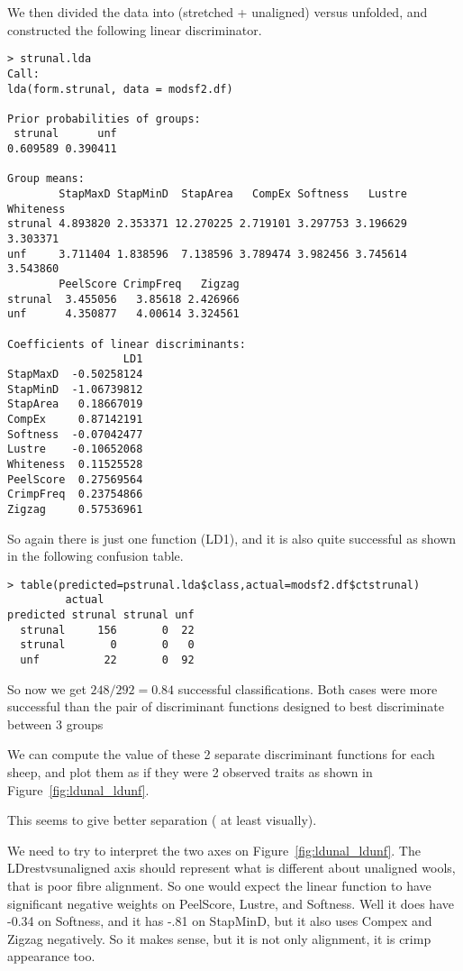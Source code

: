 \documentclass[titlepage]{article}  %
\begin{document}
We then divided the data into (stretched + unaligned) versus unfolded, and constructed the following linear discriminator. 
\begin{verbatim}
> strunal.lda
Call:
lda(form.strunal, data = modsf2.df)

Prior probabilities of groups:
 strunal      unf 
0.609589 0.390411 

Group means:
        StapMaxD StapMinD  StapArea   CompEx Softness   Lustre Whiteness
strunal 4.893820 2.353371 12.270225 2.719101 3.297753 3.196629  3.303371
unf     3.711404 1.838596  7.138596 3.789474 3.982456 3.745614  3.543860
        PeelScore CrimpFreq   Zigzag
strunal  3.455056   3.85618 2.426966
unf      4.350877   4.00614 3.324561

Coefficients of linear discriminants:
                  LD1
StapMaxD  -0.50258124
StapMinD  -1.06739812
StapArea   0.18667019
CompEx     0.87142191
Softness  -0.07042477
Lustre    -0.10652068
Whiteness  0.11525528
PeelScore  0.27569564
CrimpFreq  0.23754866
Zigzag     0.57536961
\end{verbatim}
So again there is just one function (LD1), and it is also quite successful as shown in the following confusion table.
\begin{verbatim}
> table(predicted=pstrunal.lda$class,actual=modsf2.df$ctstrunal)
         actual
predicted strunal strunal unf
  strunal     156       0  22
  strunal       0       0   0
  unf          22       0  92
\end{verbatim}
So now we get $248/292=0.84$ successful classifications.
 Both cases were more successful than the pair of discriminant functions designed to best discriminate between 3 groups

We can compute the value of these 2 separate discriminant functions for each sheep, and plot them as if they were 2 observed traits as shown in Figure~\ref{fig:ldunal_ldunf}.


This seems to give better separation ( at least visually).

We need to try to interpret the two axes on Figure~\ref{fig:ldunal_ldunf}. The LDrestvsunaligned axis should represent what is different about unaligned wools, that is poor fibre alignment. So one would expect the linear function to have significant negative weights on PeelScore, Lustre, and Softness. Well it does have -0.34 on Softness, and it has -.81 on StapMinD, but it also uses Compex and Zigzag negatively. So it makes sense, but it is not only alignment, it is crimp appearance too.
\end{document}
